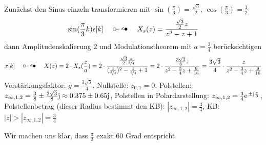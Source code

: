 \begin{ExCalc}
Zunächst den Sinus einzeln transformieren mit
$\sin(\frac{\pi}{3}) = \frac{\sqrt{3}}{2}$, $\cos(\frac{\pi}{3}) = \frac{1}{2}$
\begin{align}
\sin(\frac{\pi}{3} k) \epsilon[k] \quad\ztransf\quad X_s(z) = \frac{\frac{\sqrt{3}}{2}z}{z^2 - z +1}
\end{align}
dann Amplitudenskalierung $2$ und Modulationstheorem mit $a=\frac{3}{4}$ berücksichtigen
\begin{align}
x[k] \quad\ztransf\quad X(z) = 2 \cdot X_s(\frac{z}{a}) =
2 \cdot \frac{\frac{\sqrt{3}}{2} \frac{z}{\nicefrac{3}{4}}}{(\frac{z}{\nicefrac{3}{4}})^2 - \frac{z}{\nicefrac{3}{4}} +1}
=
2 \cdot \frac{\frac{3\sqrt{3}}{8} z}{z^2 - \frac{3}{4}z + \frac{9}{16}}
=
\frac{3\sqrt{3}}{4} \cdot \frac{z}{z^2 - \frac{3}{4}z + \frac{9}{16}}
\end{align}
%
Verstärkungsfaktor: $g=\frac{3\sqrt{3}}{4}$,
%
Nullstelle: $z_{0,1} = 0$,
%
Polstellen: $z_{\infty,1,2} = \frac{3}{8} \pm \frac{3\sqrt{3}}{8} \im \approx 0.375 \pm 0.65\im$,
%
Polstellen in Polardarstellung: $z_{\infty,1,2} = \frac{3}{4}\e^{\pm\im \frac{\pi}{3}}$,
%
Polstellenbetrag (dieser Radius bestimmt den KB): $|z_{\infty,1,2}| = \frac{3}{4}$,
%
KB: $|z|>|z_{\infty,1,2}| = \frac{3}{4}$

\end{ExCalc}
\begin{Loesung}
\begin{center}
\end{center}
Wir machen uns klar, dass $\frac{\pi}{3}$ exakt 60 Grad entspricht.
\end{Loesung}


